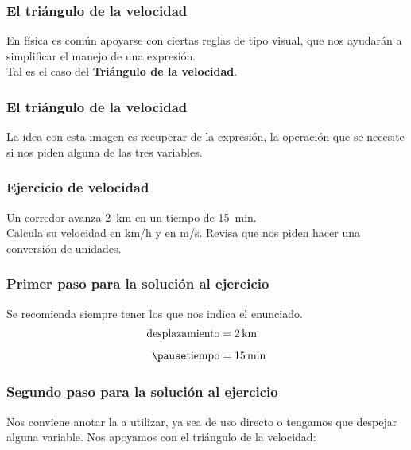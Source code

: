 \documentclass[14pt]{beamer}
\begin{document}
\begin{frame}
\frametitle{El triángulo de la velocidad}
En física es común apoyarse con ciertas reglas de tipo visual, que nos ayudarán a simplificar el manejo de una expresión.
\\
\bigskip
\pause
Tal es el caso del \textbf{Triángulo de la velocidad}.
\end{frame}
\begin{frame}
\frametitle{El triángulo de la velocidad}
\begin{figure}
\centering
{}
\end{figure}
La idea con esta imagen es recuperar de la expresión, la operación que se necesite si nos piden alguna de las tres variables.
\end{frame}
\begin{frame}
\frametitle{Ejercicio de velocidad}
Un corredor avanza \SI{2}{\kilo\meter} en un tiempo de \SI{15}{\minute}.
\\
\bigskip
\pause
Calcula su velocidad en \unit[per-mode=symbol]{\kilo\meter\per\hour} y en \unit[per-mode=symbol]{\meter\per\second}.
\pause
Revisa que nos piden hacer una conversión de unidades.
\end{frame}
\begin{frame}
\frametitle{Primer paso para la solución al ejercicio}
Se recomienda siempre tener los  que nos indica el enunciado.
\pause
\begin{eqnarray*}
\begin{aligned}
\text{desplazamiento} &= \SI{2}{\kilo\meter} \\[0.5em] \pause
\text{tiempo} &= \SI{15}{\minute}
\end{aligned}
\end{eqnarray*}
\end{frame}
\begin{frame}
\frametitle{Segundo paso para la solución al ejercicio}
Nos conviene anotar la  a utilizar, ya sea de uso directo o tengamos que despejar alguna variable. \pause Nos apoyamos con el triángulo de la velocidad:
\pause
\begin{figure}
\centering
{}
\end{figure}        
\end{frame}
\end{document}
